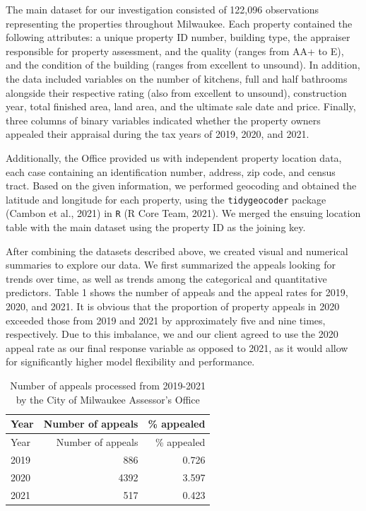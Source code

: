 \documentclass[
  12pt,
]{article}
\begin{document}
The main dataset for our investigation consisted of 122,096 observations
representing the properties throughout Milwaukee. Each property
contained the following attributes: a unique property ID number,
building type, the appraiser responsible for property assessment, and
the quality (ranges from AA+ to E), and the condition of the building
(ranges from excellent to unsound). In addition, the data included
variables on the number of kitchens, full and half bathrooms alongside
their respective rating (also from excellent to unsound), construction
year, total finished area, land area, and the ultimate sale date and
price. Finally, three columns of binary variables indicated whether the
property owners appealed their appraisal during the tax years of 2019,
2020, and 2021.

Additionally, the Office provided us with independent property location
data, each case containing an identification number, address, zip code,
and census tract. Based on the given information, we performed geocoding
and obtained the latitude and longitude for each property, using the
\texttt{tidygeocoder} package (Cambon et al., 2021) in \texttt{R} (R
Core Team, 2021). We merged the ensuing location table with the main
dataset using the property ID as the joining key.

After combining the datasets described above, we created visual and
numerical summaries to explore our data. We first summarized the appeals
looking for trends over time, as well as trends among the categorical
and quantitative predictors. Table 1 shows the number of appeals and the
appeal rates for 2019, 2020, and 2021. It is obvious that the proportion
of property appeals in 2020 exceeded those from 2019 and 2021 by
approximately five and nine times, respectively. Due to this imbalance,
we and our client agreed to use the 2020 appeal rate as our final
response variable as opposed to 2021, as it would allow for
significantly higher model flexibility and performance.

\begin{longtable}[]{@{}lrr@{}}
\caption{Number of appeals processed from 2019-2021 by the City of
Milwaukee Assessor's Office}\tabularnewline
\toprule
Year & Number of appeals & \% appealed \\
\midrule
\endfirsthead
\toprule
Year & Number of appeals & \% appealed \\
\midrule
\endhead
2019 & 886 & 0.726 \\
2020 & 4392 & 3.597 \\
2021 & 517 & 0.423 \\
\bottomrule
\end{longtable}
\end{document}
